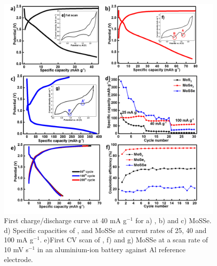 \begin{figure}[htb!]
\centering
\includegraphics[width=\textwidth]{Figures/chap4fig/MoX2CDCCV}
\caption{First charge/discharge curve at 40 mA g$^{-1}$ for a) , b)  and c) MoSSe. d) Specific capacities of ,  and MoSSe at current rates of 25, 40 and 100 mA g$^{-1}$. e)First CV scan of , f)  and g) MoSSe at a scan rate of 10 mV s$^{-1}$ in an aluminium-ion battery against Al reference electrode.}
\label{Figures/chap4fig:MoX2CDCCV}
\end{figure} 

